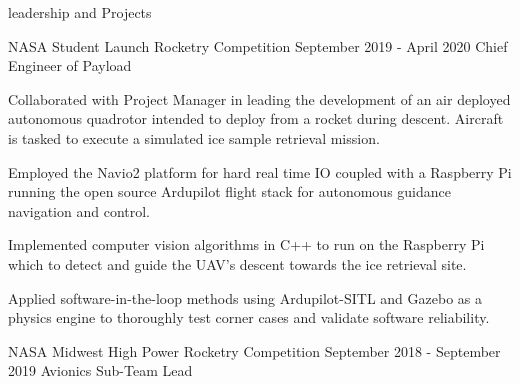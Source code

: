 \documentclass{resume} %
\begin{document}
    \begin{rSection} {leadership and Projects}

        \begin{rSubsection} {NASA Student Launch Rocketry Competition} {September 2019 - April 2020} {Chief Engineer of Payload}

            \item Collaborated with Project Manager in leading the development of an air deployed autonomous quadrotor intended to deploy from a rocket during descent. Aircraft is tasked to execute a simulated ice sample retrieval mission.
            \item Employed the Navio2 platform for hard real time IO coupled with a Raspberry Pi running the open source Ardupilot flight stack for autonomous guidance navigation and control.
            \item Implemented computer vision algorithms in C++ to run on the Raspberry Pi which to detect and guide the UAV's descent towards the ice retrieval site.
            \item Applied software-in-the-loop methods using Ardupilot-SITL and Gazebo as a physics engine to thoroughly test corner cases and validate software reliability.


        \end{rSubsection}



        \begin{rSubsection} {NASA Midwest High Power Rocketry Competition} {September 2018 - September 2019} {Avionics Sub-Team Lead}


\end{rSubsection}
\end{rSection}
\end{document}
